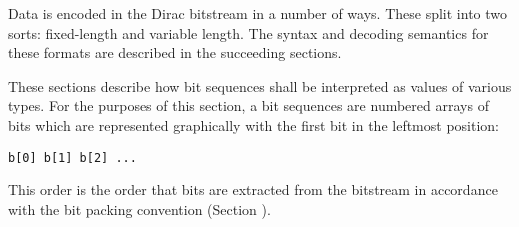 Data is encoded in the Dirac bitstream in a number of ways. These split
into two sorts: fixed-length and variable length. The syntax and
decoding semantics for these formats are described in the succeeding
sections.

These sections describe how bit sequences shall be interpreted as values
of various types. For the purposes of this section, a bit sequences are
numbered arrays of bits which are represented graphically with the first
bit in the leftmost position:

\begin{verbatim}
b[0] b[1] b[2] ...
\end{verbatim}

This order is the order that bits are extracted from the bitstream in
accordance with the bit packing convention (Section ).


